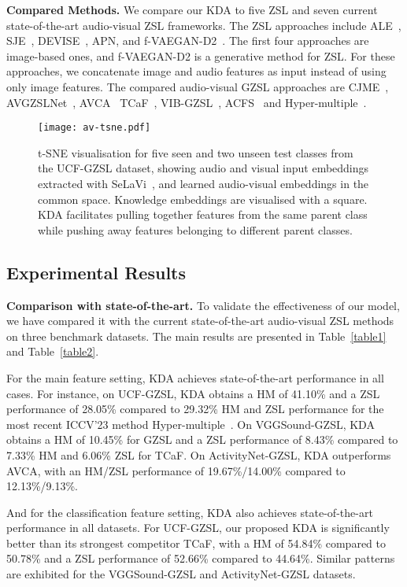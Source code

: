 \documentclass[10pt,twocolumn,letterpaper]{article}
\begin{document}
\noindent
\textbf{Compared Methods.}
We compare our KDA to five ZSL and seven current state-of-the-art audio-visual ZSL frameworks. The ZSL approaches
include ALE~\cite{ALE}, SJE~\cite{SJE}, DEVISE~\cite{DEVISE}, APN\cite{APN}, and
f-VAEGAN-D2~\cite{fVAEGAND2}. The first four approaches are image-based ones, and f-VAEGAN-D2 is a generative method for
ZSL. For these approaches, we concatenate image and audio features as input instead of using only image features.
The compared audio-visual GZSL approaches are CJME~\cite{CJME},
AVGZSLNet~\cite{AVGZSLNet}, AVCA~\cite{AVCA} TCaF~\cite{TCaF}, VIB-GZSL~\cite{VIB}, ACFS~\cite{acfs} and Hyper-multiple~\cite{HyperbolicAV}.


\begin{figure*}[t]
	\centering\texttt{[image: av-tsne.pdf]}
	\caption{t-SNE visualisation for five seen and two unseen test classes from the UCF-GZSL dataset, showing audio and visual input embeddings extracted with SeLaVi~\cite{Asano_Patrick_Rupprecht_Vedaldi_2020}, and learned audio-visual embeddings in the common space. Knowledge embeddings are visualised with a square. KDA facilitates pulling together features from the same parent class while pushing away features belonging to different parent classes.}
	\label{tsne}
\end{figure*}

\subsection{Experimental Results}

\textbf{Comparison with state-of-the-art.}
To validate the effectiveness of our model, we have compared it with the current state-of-the-art audio-visual ZSL methods on
three benchmark datasets. The main results are presented in Table~\ref{table1} and Table~\ref{table2}. 

For the main feature setting, KDA achieves state-of-the-art performance in all cases.
For instance, on UCF-GZSL, KDA obtains a HM of 41.10\% and a ZSL performance of 28.05\% compared to 29.32\% HM and ZSL performance for the most recent ICCV'23 method Hyper-multiple~\cite{HyperbolicAV}.
On VGGSound-GZSL, KDA obtains a HM of 10.45\% for GZSL and a ZSL performance of 8.43\% compared to 7.33\% HM and 6.06\% ZSL for TCaF. On ActivityNet-GZSL, KDA outperforms AVCA, with an HM/ZSL performance of 19.67\%/14.00\% compared to 12.13\%/9.13\%.


And for the classification feature setting, KDA also achieves state-of-the-art performance in all datasets.
For UCF-GZSL, our proposed KDA is significantly better than its strongest competitor TCaF, with a HM of 54.84\% compared to 50.78\% and a ZSL performance of 52.66\% compared to 44.64\%. Similar patterns are exhibited for the VGGSound-GZSL and ActivityNet-GZSL datasets.
\end{document}
